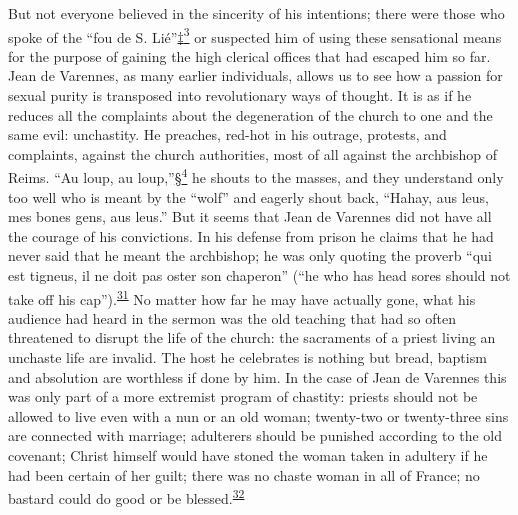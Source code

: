 But not everyone believed in the sincerity of his intentions; there were
those who spoke of the ``fou de S.
Lié''\protect\hypertarget{15_Chapter_Eight__RELIGIOUS_EXCITAT.xhtmlux5cux23id_2567}{\protect\hyperlink{23_NOTES.xhtmlux5cux23id_2568}{‡\textsuperscript{3}}}
or suspected him of using these sensational means for the purpose of
gaining the high clerical offices that had escaped him so far. Jean de
Varennes, as many earlier individuals, allows us to see how a passion
for sexual purity is transposed into revolutionary ways of thought. It
is as if he reduces all the complaints about the degeneration of the
church to one and the same evil: unchastity. He preaches, red-hot in his
outrage, protests, and complaints, against the church authorities, most
of all against the archbishop of Reims. ``Au loup, au
loup,''\protect\hypertarget{15_Chapter_Eight__RELIGIOUS_EXCITAT.xhtmlux5cux23id_2569}{\protect\hyperlink{23_NOTES.xhtmlux5cux23id_2570}{§\textsuperscript{4}}}
he shouts to the masses, and they understand only too well who is meant
by the ``wolf'' and eagerly shout back, ``Hahay, aus leus, mes bones
gens, aus leus.'' But it seems that Jean de Varennes did not have all
the courage of his convictions. In his defense from prison he claims
that he had never said that he meant the archbishop; he was only quoting
the proverb ``qui est tigneus, il ne doit pas oster son chaperon'' (``he
who has head sores should not take off his
cap'').\textsuperscript{\protect\hypertarget{15_Chapter_Eight__RELIGIOUS_EXCITAT.xhtmlux5cux23id_845}{\protect\hyperlink{23_NOTES.xhtmlux5cux23id_846}{31}}}
No matter how far he may have actually gone, what his audience had heard
in the sermon was the old teaching that had so often threatened to
disrupt the life of the church: the sacraments of a priest living an
unchaste life are invalid. The host he celebrates is nothing but bread,
baptism and absolution are worthless if done by him. In the case of Jean
de Varennes this was only part of a more extremist program of chastity:
priests should not be allowed to live even with a nun or an old woman;
twenty-two or twenty-three sins are connected with marriage; adulterers
should be punished according to the old covenant; Christ himself would
have stoned the woman taken in adultery if he had been
\protect\hypertarget{15_Chapter_Eight__RELIGIOUS_EXCITAT.xhtmlux5cux23page_228}{}{}certain
of her guilt; there was no chaste woman in all of France; no bastard
could do good or be
blessed.\textsuperscript{\protect\hypertarget{15_Chapter_Eight__RELIGIOUS_EXCITAT.xhtmlux5cux23id_843}{\protect\hyperlink{23_NOTES.xhtmlux5cux23id_844}{32}}}

